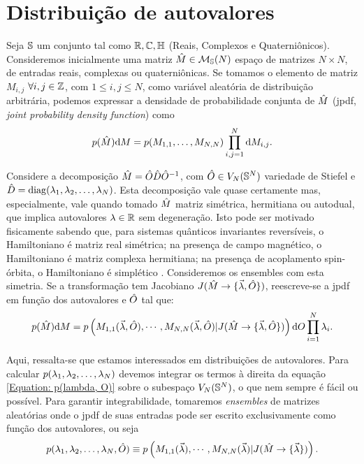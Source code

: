 \section{Distribuição de autovalores}

Seja $\mathbb{S}$ um conjunto tal como $\mathbb{R}, \mathbb{C}, \mathbb{H} $ (Reais, Complexos e Quaterniônicos). Consideremos inicialmente uma matriz $\hat M \in \mathcal{M}_{\mathbb{S}}(N)$ espaço de matrizes $N \times N$, de entradas reais, complexas ou quaterniônicas. Se tomamos o elemento de matriz $M_{i,j}$ $\forall i, j \in \mathbb{Z}$, com $1 \leq i, j \leq N$, como variável aleatória de distribuição arbitrária, podemos expressar a densidade de probabilidade conjunta de $\hat M$ (jpdf, \textit{joint probability density function}) como $$p(\hat{M}) \dd M = p(M_{1,1}, \dots, M_{N,N}) \prod_{i,j=1}^{N} \dd M_{i,j}.$$

Considere a decomposição $\hat M = \hat O \hat D \hat O^{-1}$, com $\hat O \in V_N(\mathbb{S}^N)$ variedade de Stiefel e $\hat D = \operatorname{diag}(\lambda_1, \lambda_2, \dots, \lambda_N)$. Esta decomposição vale quase certamente mas, especialmente, vale quando tomado $\hat M$ matriz simétrica, hermitiana ou autodual, que implica autovalores $\lambda \in \mathbb{R}$ sem degeneração. Isto pode ser motivado fisicamente sabendo que, para sistemas quânticos invariantes reversíveis, o Hamiltoniano é matriz real simétrica; na presença de campo magnético, o Hamiltoniano é matriz complexa hermitiana; na presença de acoplamento spin-órbita, o Hamiltoniano é simplético \cite[Capítulo~2]{RMT-firstcourse-Potters}. Consideremos os ensembles com esta simetria. Se a transformação tem Jacobiano $J(\hat M \rightarrow \{ \vec{\lambda}, \hat O \} )$, reescreve-se a jpdf em função dos autovalores e $\hat O$ tal que:
\begin{equation}
	 p(\hat{M}) \dd M = p \left( M_{1,1}(\vec{\lambda}, \hat O), \cdots, M_{N,N}(\vec{\lambda}, \hat O) | J(\hat M \rightarrow \{ \vec{\lambda}, \hat O \} ) \right) \dd O \prod_{i=1}^{N} \lambda_i.
\label{Equation: p(lambda, O)}
\end{equation}

Aqui, ressalta-se que estamos interessados em distribuições de autovalores. Para calcular $p(\lambda_1, \lambda_2, \dots, \lambda_N)$ devemos integrar os termos à direita da equação \ref{Equation: p(lambda, O)} sobre o subespaço $V_N(\mathbb{S}^N)$, o que nem sempre é fácil ou possível. Para garantir integrabilidade, tomaremos \textit{ensembles} de matrizes aleatórias onde o jpdf de suas entradas pode ser escrito exclusivamente como função dos autovalores, ou seja $$p(\lambda_1, \lambda_2, \dots, \lambda_N, \hat O) \equiv p \left( M_{1,1}(\vec{\lambda}), \cdots, M_{N,N}(\vec{\lambda}) | J(\hat M \rightarrow \{ \vec{\lambda} \} ) \right).$$

